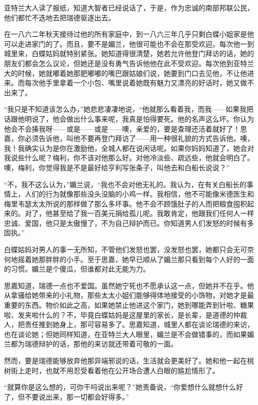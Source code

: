 \par 亚特兰大人读了报纸，知道大智者已经说话了，于是，作为忠诚的南部邦联公民，他们都忙不迭地去把瑞德驱逐出去。
\par 在一八六二年秋天接待过他的所有家庭中，到一八六三年几乎只剩白蝶小姐家是他可以走进家门的了。而且，要不是媚兰，他很可能也不会在那受欢迎。每次他一到城里来，白蝶姑妈就特别紧张。她知道得很清楚，她若允许他登门拜访的话，她的朋友们都会怎么议论，但她还是没有勇气告诉他他在此不受欢迎。每次他到亚特兰大的时候，她就嘟着她那肥嘟嘟的嘴巴跟姑娘们说，她要到门口去见他，不让他进来。而每次他手里拿着一个小包、嘴里说着她既有魅力又漂亮的好话时，她又做不出来了。
\par “我只是不知道该怎么办，”她悲悲凄凄地说，“他就那么看着我，而我——如果我把话跟他明说了，他会做出什么事来呢，我真是怕得要死。他的名声这么坏。你认为他会不会揍我呀——或是——或是——噢，亲爱的，要是查理还活着就好了！思嘉，你必须告诉他，叫他不要再登门拜访了——用一种很礼貌的方式告诉他。噢，我！我确实认为是你在激励他，全城人都在说闲话呢。如果你妈妈知道了，她会对我说些什么呢？梅利，你不该对他那么好。对他冷淡些、疏远些，他就会明白了。噢，梅利，你觉得我是不是最好给亨利写张条子，叫他去和白船长说说？”
\par “不，我不这么认为，”媚兰说，“我也不会对他无礼的。我认为，在有关白船长的事情上，人们的行为就像那些没头没脑的小鸡一样。我相信，他不可能像米德医生和梅里韦瑟太太所说的那样做了那么多坏事。他不会不顾饿肚子的人而把粮食囤积起来的。对了，他甚至给了我一百美元捐给孤儿呢。我敢肯定，他跟我们任何人一样忠诚、爱国，他只是太傲慢了，不为自己辩护而已。你知道男人们发怒的时候有多固执。”
\par 白蝶姑妈对男人的事一无所知，不管他们发怒也罢，没发怒也罢，她都只会无可奈何地摇着她那胖胖的小手。至于思嘉，她早已顺从了媚兰那只看到每个人好的一面的习惯。媚兰是个傻瓜，但谁都对此无能为力。
\par 思嘉知道，瑞德一点也不爱国。虽然她宁死也不愿承认这一点，但她并不在乎。他从拿骚给她带来的小礼物，那些太太小姐们能够得体地接受的小饰物，对她才是最重要的东西。物价如此之高，如果她禁止他进这个家门，她到哪能弄到针啦、糖果啦、发夹啦什么的？不，毕竟白蝶姑妈是这屋里的家长，是长辈，是道德的仲裁人，把责任推到她身上，那可容易多了。思嘉知道，城里人都在谈论瑞德的来访，也在谈论她；但她同样知道，在亚特兰大人眼里，媚兰是不会做错事的，而如果媚兰都为瑞德辩护的话，那他的来访就还带着可敬的一面。
\par 然而，要是瑞德能够放弃他那异端邪说的话，生活就会更美好了。她和他一起在桃树街上走时，也就不用忍受看着他在公开场合遭人白眼的尴尬情形了。
\par “就算你是这么想的，可你干吗说出来呢？”她责备说，“你爱想什么就想什么好了，但不要说出来，那一切都会好得多。”
